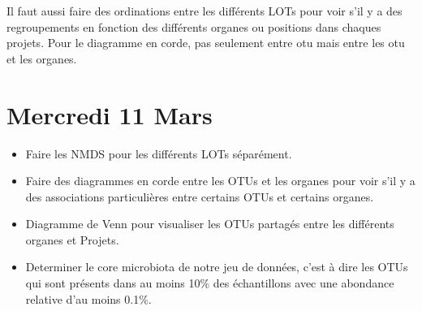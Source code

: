 \documentclass[12pt,a4paper]{report}
\begin{document}
\begin{attention}
Il faut aussi faire des ordinations entre les différents LOTs pour voir s'il y a des regroupements en fonction des différents organes ou positions dans chaques projets.
Pour le diagramme en corde, pas seulement entre otu mais entre les otu et les organes.
\end{attention}



\section{Mercredi 11 Mars}

\begin{objectifs}
    \begin{itemize}
        \item Faire les NMDS pour les différents LOTs séparément.
        \item Faire des diagrammes en corde entre les OTUs et les organes pour voir s'il y a des associations particulières entre certains OTUs et certains organes.
        \item Diagramme de Venn pour visualiser les OTUs partagés entre les différents organes et Projets.
        \item Determiner le core microbiota de notre jeu de données, c'est à dire les OTUs qui sont présents dans au moins 10\% des échantillons avec une abondance relative d'au moins 0.1\%.
    \end{itemize}
\end{objectifs}
\end{document}
